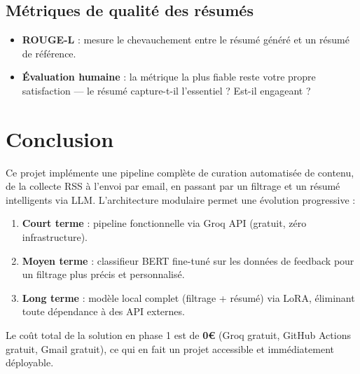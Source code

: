 \documentclass[11pt, a4paper]{article}
\begin{document}
\subsection{Métriques de qualité des résumés}

\begin{itemize}
    \item \textbf{ROUGE-L} : mesure le chevauchement entre le résumé généré et un résumé de référence.
    \item \textbf{Évaluation humaine} : la métrique la plus fiable reste votre propre satisfaction --- le résumé capture-t-il l'essentiel ? Est-il engageant ?
\end{itemize}

\section{Conclusion}

Ce projet implémente une pipeline complète de curation automatisée de contenu, de la collecte RSS à l'envoi par email, en passant par un filtrage et un résumé intelligents via LLM. L'architecture modulaire permet une évolution progressive :

\begin{enumerate}
    \item \textbf{Court terme} : pipeline fonctionnelle via Groq API (gratuit, zéro infrastructure).
    \item \textbf{Moyen terme} : classifieur BERT fine-tuné sur les données de feedback pour un filtrage plus précis et personnalisé.
    \item \textbf{Long terme} : modèle local complet (filtrage + résumé) via LoRA, éliminant toute dépendance à des API externes.
\end{enumerate}

Le coût total de la solution en phase 1 est de \textbf{0\euro{}} (Groq gratuit, GitHub Actions gratuit, Gmail gratuit), ce qui en fait un projet accessible et immédiatement déployable.
\end{document}
